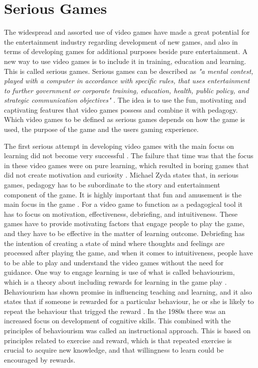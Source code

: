 \section{Serious Games}
\label{sec:sergames}
The widespread and assorted use of video games have made a great potential for the entertainment industry regarding development of new games, and also in terms of developing games for additional purposes beside pure entertainment. A new way to use video games is to include it in training, education and learning. This is called serious games. Serious games can be described as \emph{"a mental contest, played with a computer in accordance with specific rules, that uses entertainment to further government or corporate training, education, health, public policy, and strategic communication objectives"} \cite{zyda2005visual}. The idea is to use the fun, motivating and captivating features that video games possess and combine it with pedagogy. Which video games to be defined as serious games depends on how the game is used, the purpose of the game and the users gaming experience. 

The first serious attempt in developing video games with the main focus on learning did not become very successful \cite{understandingvg}. The failure that time was that the focus in these  video games were on pure learning, which resulted in boring games that did not create motivation and curiosity \cite{understandingvg} \cite{susi2007serious}. Michael Zyda states that, in serious games, pedagogy has to be subordinate to the story and entertainment component of the game. It is highly important that fun and amusement is the main focus in the game \cite{zyda2005visual}. For a video game to function as a pedagogical tool it has to focus on motivation, effectiveness, debriefing, and intuitiveness. These games have to provide motivating factors that engage people to play the game, and they have to be effective in the matter of learning outcome. Debriefing has the intention of creating a state of mind where thoughts and feelings are processed after playing the game, and when it comes to intuitiveness, people have to be able to play and understand the video games without the need for guidance. One way to engage learning is use of what is called behaviourism, which is a theory about including rewards for learning in the game play \cite{understandingvg}. Behaviourism has shown promise in influencing teaching and learning, and it also states that if someone is rewarded for a particular behaviour, he or she is likely to repeat the behaviour that trigged the reward \cite{understandingvg} \cite{behaviour}. In the 1980s there was an increased focus on development of cognitive skills. This combined with the principles of behaviourism was called an instructional approach. This is based on principles related to exercise and reward, which is that repeated exercise is crucial to acquire new knowledge, and that willingness to learn could be encouraged by rewards. 

